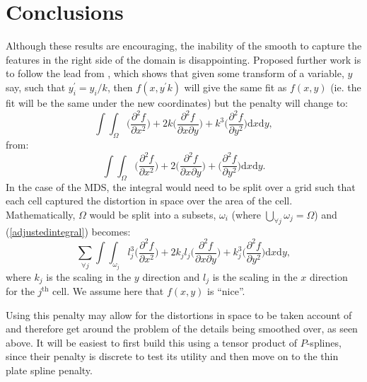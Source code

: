 \documentclass[a4paper,10pt]{article}
\begin{document}
\section{Conclusions}

Although these results are encouraging, the inability of the smooth to capture the features in the right side of the domain is disappointing. Proposed further work is to follow the lead from \cite{wood2000}, which shows that given some transform of a variable, $y$ say, such that $y_i^\prime=y_i/k$, then $f(x,y^\prime k)$ will give the same fit as $f(x,y)$ (ie. the fit will be the same under the new coordinates) but the penalty will change to:
\begin{equation}
\int\int_\Omega \Big( \frac{\partial^2 f}{\partial x^2} \Big) + 2k\Big( \frac{\partial^2 f}{\partial x \partial y} \Big) + k^3\Big( \frac{\partial^2 f}{\partial y^2} \Big) \text{d}x \text{d}y,
\label{adjustedintegral}
\end{equation}
from:
\begin{equation*}
\int\int_\Omega \Big( \frac{\partial^2 f}{\partial x^2} \Big) + 2\Big( \frac{\partial^2 f}{\partial x \partial y} \Big) + \Big( \frac{\partial^2 f}{\partial y^2} \Big) \text{d}x \text{d}y.
\end{equation*}
In the case of the MDS, the integral would need to be split over a grid such that each cell captured the distortion in space over the area of the cell. Mathematically, $\Omega$ would be split into a subsets, $\omega_i$ (where $\bigcup_{\forall j} \omega_j = \Omega$) and (\ref{adjustedintegral}) becomes:
\begin{equation}
\sum_{\forall j} \int\int_{\omega_j} l_j^3 \Big( \frac{\partial^2 f}{\partial x^2} \Big) + 2k_jl_j\Big( \frac{\partial^2 f}{\partial x \partial y} \Big) + k_j^3\Big( \frac{\partial^2 f}{\partial y^2} \Big) \text{d}x \text{d}y,
\label{adjustedintegral}
\end{equation}
where $k_j$ is the scaling in the $y$ direction and $l_j$ is the scaling in the $x$ direction for the $j^{\text{th}}$ cell. We assume here that $f(x,y)$ is ``nice''.

Using this penalty may allow for the distortions in space to be taken account of and therefore get around the problem of the details being smoothed over, as seen above. It will be easiest to first build this using a tensor product of $P$-splines, since their penalty is discrete to test its utility and then move on to the thin plate spline penalty.
\end{document}
